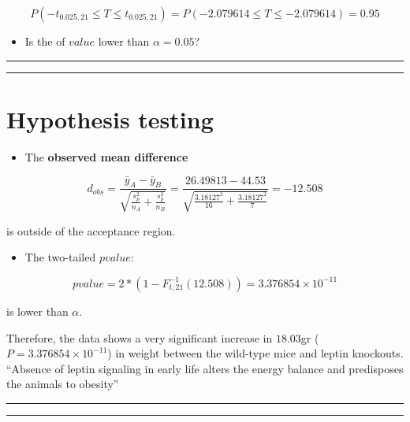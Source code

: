 \documentclass[
]{book}
\providecommand{\tightlist}{%
  \setlength{\itemsep}{0pt}\setlength{\parskip}{0pt}}
\begin{document}
\[P(-t_{0.025, 21} \leq T \leq t_{0.025, 21})=P(-2.079614 \leq T \leq -2.079614)=0.95\]

\begin{itemize}
\tightlist
\item
  Is the of \(value\) lower than \(\alpha=0.05\)?
\end{itemize}

\begin{center}\rule{0.5\linewidth}{0.5pt}\end{center}

\begin{center}\rule{0.5\linewidth}{0.5pt}\end{center}

\hypertarget{hypothesis-testing-3}{%
\section{Hypothesis testing}\label{hypothesis-testing-3}}

\begin{itemize}
\tightlist
\item
  The \textbf{observed mean difference}
\end{itemize}

\[d_{obs}=\frac{\bar{y}_A-\bar{y}_B }{\sqrt{\frac{s^2_p}{n_A}+\frac{s^2_p}{n_B}}}=\frac{26.49813-44.53}{\sqrt{\frac{3.18127^2}{16}+\frac{3.18127^2}{7}}}=-12.508\]

is outside of the acceptance region.

\begin{itemize}
\tightlist
\item
  The two-tailed \(pvalue\):
\end{itemize}

\[pvalue=2*(1-F^{-1}_{t,21}(12.508))=3.376854 \times 10^{-11}\]

is lower than \(\alpha\).

Therefore, the data shows a very significant increase in \(18.03\)gr (\(P=3.376854 \times 10^{-11}\)) in weight between the wild-type mice and leptin knockouts. ``Absence of leptin signaling in early life alters the energy balance and predisposes the animals to obesity''

\begin{center}\rule{0.5\linewidth}{0.5pt}\end{center}

\begin{center}\rule{0.5\linewidth}{0.5pt}\end{center}
\end{document}
